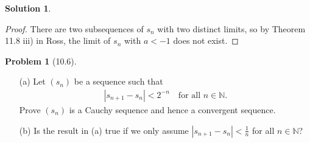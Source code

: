\documentclass[12pt]{article}
\theoremstyle{definition} %
\newtheorem{solution}{Solution}
\newtheorem{problem}{Problem}
\theoremstyle{plain} %
\begin{document}
\begin{solution}
\begin{enumerate}
\begin{proof}
        There are two subsequences of $s_n$ with two distinct limits, so by Theorem 11.8 iii) in Ross, the limit of $s_n$ with $a < -1$ does not exist. 
    \end{proof}
\end{enumerate}
\end{solution}



\begin{problem}[10.6]
    \begin{itemize}
        \item[(a)] Let $(s_n)$ be a sequence such that
        \begin{align}
        |s_{n+1} - s_n| < 2^{-n} \quad \text{for all } n \in \mathbb{N}.
        \end{align}
        Prove $(s_n)$ is a Cauchy sequence and hence a convergent sequence.
        \item[(b)] Is the result in (a) true if we only assume $|s_{n+1} - s_n| < \frac{1}{n}$ for all $n \in \mathbb{N}$?
    \end{itemize}


\end{problem}
\end{document}

